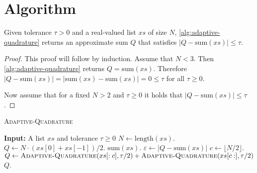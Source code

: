 \section{Algorithm}

\begin{proposition}
    Given tolerance $\tau > 0$ and a real-valued list $xs$ of size $N$, \cref{alg:adaptive-quadrature} returns an approximate sum $Q$ that satisfies $|Q - \text{sum}(xs)| \leq \tau$.  
\end{proposition}
\begin{proof}
    This proof will follow by induction. Assume that $N < 3$. Then \cref{alg:adaptive-quadrature} returns $Q = \text{sum}(xs)$. Therefore $|Q - \text{sum}(xs)| = |\text{sum}(xs) - \text{sum}(xs)| = 0 \leq \tau$ for all $\tau \geq 0$. 
    
    Now assume that for a fixed $N > 2$ and $\tau \geq 0$ it holds that $|Q - \text{sum}(xs)| \leq \tau$. 
\end{proof}

\begin{algorithm}[t]
    \caption{\textsc{Adaptive-Quadrature}}\label{alg:adaptive-quadrature}
    \begin{algorithmic}
    \State \textbf{Input:} A list $xs$ and tolerance $\tau\geq0$
    \State $N \leftarrow \text{length}(xs)$.
        \State $Q \leftarrow N \cdot (xs[0] + xs[-1]) / 2$.
    \Else
        \State \Return $\text{sum}(xs)$.
    \EndIf
    \State $\varepsilon \leftarrow |Q - \text{sum}(xs)|$
    \If{$\varepsilon \geq \tau$}
        \State $c \leftarrow \lfloor N / 2 \rfloor$.
        \State $Q \leftarrow \textsc{Adaptive-Quadrature}(xs[:c], \tau /2) + \textsc{Adaptive-Quadrature}(xs[c:], \tau /2)$
    \EndIf
    \State \Return $Q$.
    \end{algorithmic}
    \end{algorithm}

